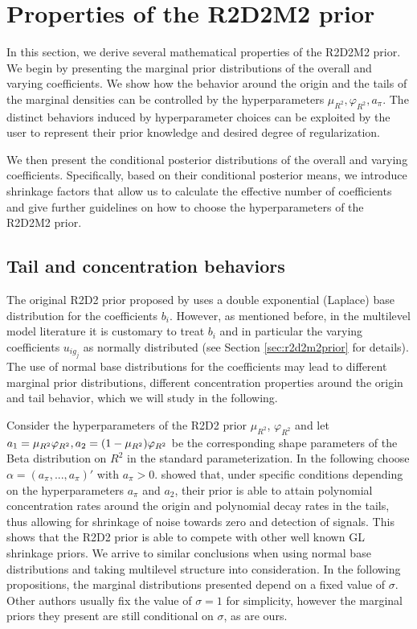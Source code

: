 \section{Properties of the R2D2M2 prior}
\label{sec:Properties}
In this section, we derive several mathematical properties of the R2D2M2 prior. We begin by presenting the marginal prior distributions of the overall and varying coefficients. We show how the behavior around the origin and the tails of the marginal densities can be controlled by the hyperparameters $\mu_{R^2}, \varphi_{R^2}, a_\pi$. The distinct behaviors induced by hyperparameter choices can be exploited by the user to represent their prior knowledge and desired degree of regularization.

We then present the conditional posterior distributions of the overall and varying coefficients. Specifically, based on their conditional posterior means, we introduce shrinkage factors that allow us to calculate the effective number of coefficients and give further guidelines on how to choose the hyperparameters of the R2D2M2 prior. \\

\subsection{Tail and concentration behaviors}
\label{subsection:tailcon}

The original R2D2 prior proposed by \cite{r2d2zhang} uses a double exponential (Laplace) base distribution for the coefficients $b_i$. However, as mentioned before, in the multilevel model literature it is customary to treat $b_i$ and in particular the varying coefficients $u_{ig_j}$ as normally distributed (see Section \ref{sec:r2d2m2prior} for details). The use of normal base distributions for the coefficients may lead to different marginal prior distributions, different concentration properties around the origin and tail behavior, which we will study in the following.

Consider the hyperparameters of the R2D2 prior $\mu_{R^2}$, $\varphi_{R^2}$ and let $a_1= \mu_{R^2} \varphi_{R^2},  a_2=(1-\mu_{R^2})\varphi_{R^2}$ be the corresponding shape parameters of the Beta distribution on $R^2$ in the standard parameterization. In the following choose $\alpha=(a_\pi,...,a_\pi)'$ with $a_\pi > 0$. \cite{r2d2zhang} showed that, under specific conditions depending on the hyperparameters $a_\pi$ and $a_2$, their prior is able to attain polynomial concentration rates around the origin and polynomial decay rates in the tails, thus allowing for shrinkage of noise towards zero and detection of signals. This shows that the R2D2 prior is able to compete with other well known GL shrinkage priors. We arrive to similar conclusions when using normal base distributions and taking multilevel structure into consideration. In the following propositions, the marginal distributions presented depend on a fixed value of $\sigma$. Other authors \citep{Horseshoe, BaiHypothesisNB, r2d2zhang} usually fix the value of $\sigma=1$ for simplicity, however the marginal priors they present are still conditional on $\sigma$, as are ours.

